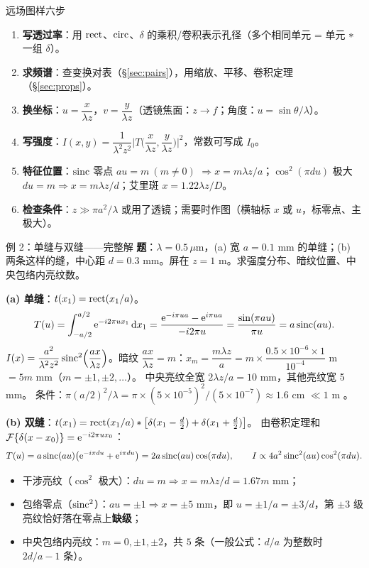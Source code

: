 \begin{recipe}{远场图样六步}\label{rcp:fraun}
\begin{enumerate}
\item \textbf{写透过率}：用 $\operatorname{rect}$、$\operatorname{circ}$、$\delta$ 的乘积/卷积表示孔径（多个相同单元 = 单元 $\ast$ 一组 $\delta$）。
\item \textbf{求频谱}：查变换对表（§\ref{sec:pairs}），用缩放、平移、卷积定理（§\ref{sec:props}）。
\item \textbf{换坐标}：$u=\dfrac{x}{\lambda z}$，$v=\dfrac{y}{\lambda z}$（透镜焦面：$z\to f$；角度：$u=\sin\theta/\lambda$）。
\item \textbf{写强度}：$I(x,y)=\dfrac{1}{\lambda^2z^2}\Big|T\Big(\dfrac{x}{\lambda z},\dfrac{y}{\lambda z}\Big)\Big|^2$，常数可写成 $I_0$。
\item \textbf{特征位置}：$\operatorname{sinc}$ 零点 $au=m\ (m\ne0)$ $\Rightarrow x=m\lambda z/a$；$\cos^2(\pi du)$ 极大 $du=m\Rightarrow x=m\lambda z/d$；艾里斑 $x=1.22\lambda z/D$。
\item \textbf{检查条件}：$z\gg\pi a^2/\lambda$ 或用了透镜；需要时作图（横轴标 $x$ 或 $u$，标零点、主极大）。
\end{enumerate}
\end{recipe}

\begin{exam}{例 2：单缝与双缝——完整解}\label{ex:slit}
\textbf{题}：$\lambda=0.5\,\mu$m，(a) 宽 $a=0.1$ mm 的单缝；(b) 两条这样的缝，中心距 $d=0.3$ mm。屏在 $z=1$ m。求强度分布、暗纹位置、中央包络内亮纹数。

\textbf{(a) 单缝}：$t(x_1)=\operatorname{rect}(x_1/a)$。
\[
T(u)=\int_{-a/2}^{a/2}\mathrm{e}^{-i2\pi ux_1}\,\mathrm{d} x_1=\frac{\mathrm{e}^{-i\pi ua}-\mathrm{e}^{i\pi ua}}{-i2\pi u}=\frac{\sin(\pi au)}{\pi u}=a\operatorname{sinc}(au).
\]
$I(x)=\dfrac{a^2}{\lambda^2z^2}\operatorname{sinc}^2\!\Big(\dfrac{ax}{\lambda z}\Big)$。暗纹 $\dfrac{ax}{\lambda z}=m$：$x_m=\dfrac{m\lambda z}{a}=m\times\dfrac{0.5\times10^{-6}\times1}{10^{-4}}$ m $=5m$ mm（$m=\pm1,\pm2,\ldots$）。
中央亮纹全宽 $2\lambda z/a=10$ mm，其他亮纹宽 5 mm。
条件：$\pi(a/2)^2/\lambda=\pi\times(5\times10^{-5})^2/(5\times10^{-7})\approx1.6$ cm $\ll1$ m \checkmark。

\textbf{(b) 双缝}：$t(x_1)=\operatorname{rect}(x_1/a)\ast\big[\delta(x_1-\tfrac d2)+\delta(x_1+\tfrac d2)\big]$。
由卷积定理和 $\mathcal{F}\{\delta(x-x_0)\}=\mathrm{e}^{-i2\pi ux_0}$：
\[
T(u)=a\operatorname{sinc}(au)\big(\mathrm{e}^{-i\pi du}+\mathrm{e}^{i\pi du}\big)=2a\operatorname{sinc}(au)\cos(\pi du),\qquad
I\propto4a^2\operatorname{sinc}^2(au)\cos^2(\pi du).
\]
\begin{itemize}
\item 干涉亮纹（$\cos^2$ 极大）：$du=m\Rightarrow x=m\lambda z/d=1.67m$ mm；
\item 包络零点（$\operatorname{sinc}^2$）：$au=\pm1\Rightarrow x=\pm5$ mm，即 $u=\pm1/a=\pm3/d$，第 $\pm3$ 级亮纹恰好落在零点上\textbf{缺级}；
\item 中央包络内亮纹：$m=0,\pm1,\pm2$，共 $5$ 条（一般公式：$d/a$ 为整数时 $2d/a-1$ 条）。
\end{itemize}
\end{exam}

